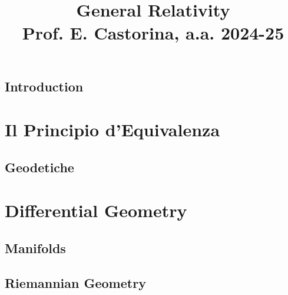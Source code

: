 \documentclass[a4paper, 12pt, openany]{book}
\title{\Huge\textbf{General Relativity} \\ \large Prof. E. Castorina, a.a. 2024-25}
\begin{document}
\frontmatter

\maketitle

\tableofcontents
\pagestyle{contents}

\mainmatter

\chapter*{Introduction}
\pagestyle{introd}



\part{Il Principio d'Equivalenza}
\pagestyle{body}

\chapter{Geodetiche}


\part{Differential Geometry}

\chapter{Manifolds}


\chapter{Riemannian Geometry}

\end{document}
